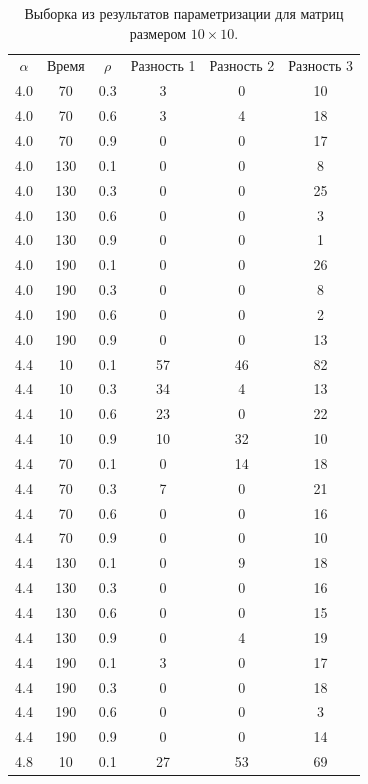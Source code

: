 \documentclass[12pt]{report}
\begin{document}
\begin{table}[H]

	\caption{Выборка из результатов параметризации для матриц размером $10\times10$.}
	\label{tab:v7}
	\begin{center}

		\begin{tabular}{|c@{\hspace{7mm}}|c@{\hspace{7mm}}|c@{\hspace{7mm}}|c|c|c|}

			\hline
			$\alpha$        & Время      & $\rho$      &Разность 1    &Разность 2    &Разность 3\\
			
4.0 & 70 & 0.3 & 3 & 0 & 10 \\
4.0 & 70 & 0.6 & 3 & 4 & 18 \\
4.0 & 70 & 0.9 & 0 & 0 & 17 \\
4.0 & 130 & 0.1 & 0 & 0 & 8 \\
4.0 & 130 & 0.3 & 0 & 0 & 25 \\
4.0 & 130 & 0.6 & 0 & 0 & 3 \\
4.0 & 130 & 0.9 & 0 & 0 & 1 \\
4.0 & 190 & 0.1 & 0 & 0 & 26 \\
4.0 & 190 & 0.3 & 0 & 0 & 8 \\
4.0 & 190 & 0.6 & 0 & 0 & 2 \\
4.0 & 190 & 0.9 & 0 & 0 & 13 \\
4.4 & 10 & 0.1 & 57 & 46 & 82 \\
4.4 & 10 & 0.3 & 34 & 4 & 13 \\
4.4 & 10 & 0.6 & 23 & 0 & 22 \\
4.4 & 10 & 0.9 & 10 & 32 & 10 \\
4.4 & 70 & 0.1 & 0 & 14 & 18 \\
4.4 & 70 & 0.3 & 7 & 0 & 21 \\
4.4 & 70 & 0.6 & 0 & 0 & 16 \\
4.4 & 70 & 0.9 & 0 & 0 & 10 \\
4.4 & 130 & 0.1 & 0 & 9 & 18 \\
4.4 & 130 & 0.3 & 0 & 0 & 16 \\
4.4 & 130 & 0.6 & 0 & 0 & 15 \\
4.4 & 130 & 0.9 & 0 & 4 & 19 \\
4.4 & 190 & 0.1 & 3 & 0 & 17 \\
4.4 & 190 & 0.3 & 0 & 0 & 18 \\
4.4 & 190 & 0.6 & 0 & 0 & 3 \\
4.4 & 190 & 0.9 & 0 & 0 & 14 \\
4.8 & 10 & 0.1 & 27 & 53 & 69 \\

			
\hline
		\end{tabular}
	\end{center}
\end{table}
\end{document}
